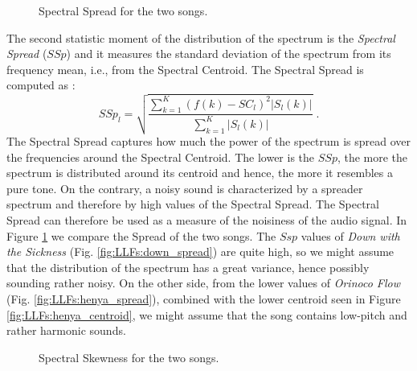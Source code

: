 \begin{figure}[tb]
        \centering
       \hfil
      \caption{Spectral Spread for the two songs.}
      \label{fig:LLFs:spread}          
\end{figure}

The second statistic moment of the distribution of the spectrum is the \textit{Spectral Spread} ($SSp$) and it measures the standard deviation of the spectrum from its frequency mean, i.e., from the Spectral Centroid. The Spectral Spread is computed as :
\begin{equation}\label{eq:FSS}
SSp_l = \sqrt{\frac{\sum\limits_{k=1}^{K}(f(k)-SC_l)^2 |S_l(k)|}{\sum\limits_{k=1}^{K}|S_l(k)|}} \;.
\end{equation}
The Spectral Spread captures how much the power of the spectrum is spread over the frequencies around the Spectral Centroid. The lower is the $SSp$, the more the spectrum is distributed around its centroid and hence, the more it resembles a pure tone. On the contrary, a noisy sound is characterized by a spreader spectrum and therefore by high values of the Spectral Spread. The Spectral Spread can therefore be used as a measure of the noisiness of the audio signal. In Figure \ref{fig:LLFs:spread} we compare the Spread of the two songs. The $Ssp$ values of \textit{Down with the Sickness} (Fig. \ref{fig:LLFs:down_spread}) are quite high, so we might assume that the distribution of the spectrum has a great variance, hence possibly sounding rather noisy. On the other side, from the lower values of \textit{Orinoco Flow} (Fig. \ref{fig:LLFs:henya_spread}), combined with the lower centroid seen in Figure \ref{fig:LLFs:henya_centroid}, we might assume that the song contains low-pitch and rather harmonic sounds.
	

\begin{figure}[tb]
        \centering
           \hfil
          \caption{Spectral Skewness for the two songs.}
          \label{fig:LLFs:skewness}          
\end{figure}
	
